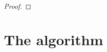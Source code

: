 \documentclass[envcountsame]{llncs} %
\begin{document}
\begin{proof}
\end{proof}



\section{The algorithm}
\label{sec:algo}

\end{document}
